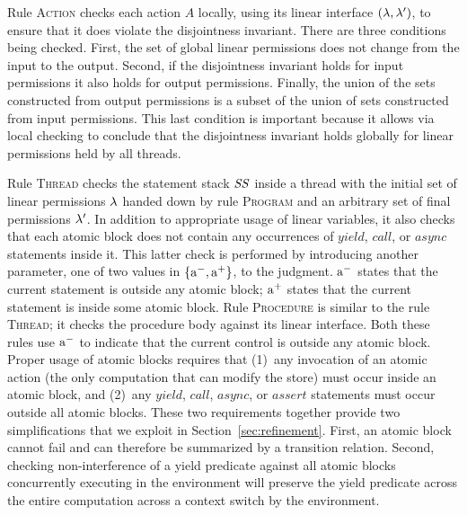 Rule \textsc{Action} checks each action $A$ locally, using its linear interface $(\lambda,\lambda')$,
to ensure that it does violate the disjointness invariant.
There are three conditions being checked.
First, the set of global linear permissions does not change from the input to the output.
Second, if the disjointness invariant holds for input permissions it also holds for output permissions.
Finally, the union of the sets constructed from output permissions is a subset of the union of sets
constructed from input permissions.  
This last condition is important because it allows via local checking to conclude that the disjointness invariant holds globally
for linear permissions held by all threads.

Rule \textsc{Thread} checks the statement stack $\mathit{SS}$ inside a thread
with the initial set of linear permissions $\lambda$ handed down by rule \textsc{Program} 
and an arbitrary set of final permissions $\lambda'$.
In addition to appropriate usage of linear variables, it also checks that each atomic block does not contain any 
occurrences of $\mathit{yield}$, $\mathit{call}$, or $\mathit{async}$ statements inside it.
This latter check is performed by introducing another parameter, one of two values in $\{\mathrm{a^-},\mathrm{a^+}\}$, 
to the judgment.
$\mathrm{a^-}$ states that the current statement is outside any atomic block;
$\mathrm{a^+}$ states that the current statement is inside some atomic block.
Rule \textsc{Procedure} is similar to the rule \textsc{Thread};
it checks the procedure body against its linear interface.
Both these rules use $\mathrm{a^-}$ to indicate that the current control is outside any atomic block.
Proper usage of atomic blocks requires that 
(1)~any invocation of an atomic action (the only computation that can modify the store) must occur inside an atomic block, and
(2)~any $\mathit{yield}$, $\mathit{call}$, $\mathit{async}$, or $\mathit{assert}$ statements must occur outside all atomic blocks.
These two requirements together provide two simplifications that we exploit in Section~\ref{sec:refinement}.
First, an atomic block cannot fail and can therefore be summarized by a transition relation.
Second, checking non-interference of a yield predicate against all atomic blocks concurrently executing 
in the environment will preserve the yield predicate across the entire computation across a context switch by the environment.

